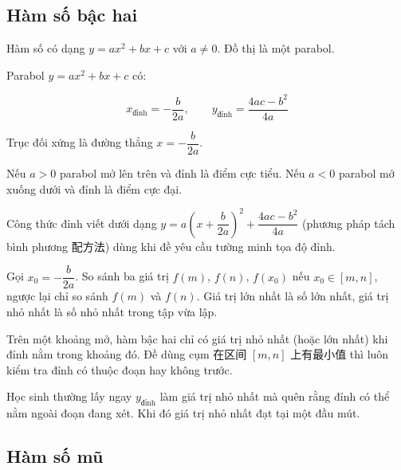 \documentclass[11pt, a4paper]{article}
\begin{document}
\subsection{Hàm số bậc hai}

\begin{dinhnghia}
Hàm số có dạng $y = ax^2 + bx + c$ với $a \neq 0$. Đồ thị là một parabol.
\end{dinhnghia}
\begin{dinhly}
Parabol $y = ax^2 + bx + c$ có:

$$x_{\text{đỉnh}} = -\frac{b}{2a}, \qquad y_{\text{đỉnh}} = \frac{4ac - b^2}{4a}$$

Trục đối xứng là đường thẳng $x = -\dfrac{b}{2a}$.
\end{dinhly}
\begin{dinhly}
Nếu $a > 0$ parabol mở lên trên và đỉnh là điểm cực tiểu. Nếu $a < 0$ parabol mở xuống dưới và đỉnh là điểm cực đại.

 Công thức đỉnh viết dưới dạng $y = a\left(x + \dfrac{b}{2a}\right)^2 + \dfrac{4ac - b^2}{4a}$ (phương pháp tách bình phương 配方法) dùng khi đề yêu cầu tường minh tọa độ đỉnh.
\end{dinhly}
\begin{dinhly}
Gọi $x_0 = -\dfrac{b}{2a}$. So sánh ba giá trị $f(m)$, $f(n)$, $f(x_0)$ nếu $x_0 \in [m, n]$, ngược lại chỉ so sánh $f(m)$ và $f(n)$. Giá trị lớn nhất là số lớn nhất, giá trị nhỏ nhất là số nhỏ nhất trong tập vừa lập.

 Trên một khoảng mở, hàm bậc hai chỉ có giá trị nhỏ nhất (hoặc lớn nhất) khi đỉnh nằm trong khoảng đó. Đề dùng cụm 在区间 $[m,n]$ 上有最小值 thì luôn kiểm tra đỉnh có thuộc đoạn hay không trước.

 Học sinh thường lấy ngay $y_{\text{đỉnh}}$ làm giá trị nhỏ nhất mà quên rằng đỉnh có thể nằm ngoài đoạn đang xét. Khi đó giá trị nhỏ nhất đạt tại một đầu mút.
\end{dinhly}
\subsection{Hàm số mũ}
\end{document}
